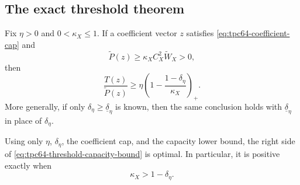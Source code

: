 \subsection{The exact threshold theorem}

\begin{theorem}
\label{thm:tpc64-threshold-capacity}
Fix \(\eta>0\) and \(0<\kappa_X\le1\).  If a coefficient vector \(z\)
satisfies \eqref{eq:tpc64-coefficient-cap} and
\begin{equation}
 \widetilde P(z)
 \ge \kappa_X C_X^2\widetilde W_X>0,
 \label{eq:tpc64-capacity-lower-hypothesis}
\end{equation}
then
\begin{equation}
 \boxed{
 \frac{T(z)}{\widetilde P(z)}
 \ge
 \eta
 \left(
  1-\frac{1-\delta_\eta}{\kappa_X}
 \right)_+.}
 \label{eq:tpc64-threshold-capacity-bound}
\end{equation}
More generally, if only
\(\delta_\eta\ge\underline\delta_\eta\) is known, then the same conclusion
holds with \(\underline\delta_\eta\) in place of \(\delta_\eta\).

Using only \(\eta\), \(\delta_\eta\), the coefficient cap, and the
capacity lower bound, the right side of
\eqref{eq:tpc64-threshold-capacity-bound} is optimal.  In particular, it
is positive exactly when
\begin{equation}
 \boxed{\kappa_X>1-\delta_\eta.}
 \label{eq:tpc64-capacity-positive-threshold}
\end{equation}
\end{theorem}

